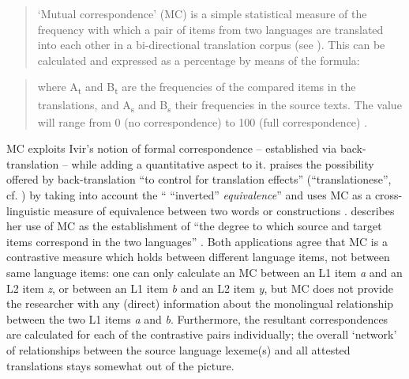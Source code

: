 \begin{quote}
‘Mutual correspondence’ (MC) is a simple statistical measure of the frequency with which a pair of items from two languages are translated into each other in a bi-directional translation corpus (see \citealt{hasselgard_adverbial_1999}). This can be calculated and expressed as a percentage by means of the formula:
\end{quote}

\begin{quote}\end{quote} 

\begin{quote}
where A\textsubscript{t} and B\textsubscript{t} are the frequencies of the compared items in the translations, and A\textsubscript{s} and B\textsubscript{s} their frequencies in the source texts. The value will range from 0 (no correspondence) to 100 (full correspondence) \citep[9]{altenberg_correspondence_2007}.
\end{quote}

MC exploits Ivir’s notion of formal correspondence – established via back-translation – while adding a quantitative aspect to it. \citet{de_los_angeles_gomez_gonzalez_causative_2008} praises the possibility offered by back-translation “to control for translation effects” (“translationese”, cf. \citealt{wollin_translationese_1986}) by taking into account the “ “inverted” \textit{equivalence}” \citep[186]{de_los_angeles_gomez_gonzalez_causative_2008} and uses MC as a cross-linguistic measure of equivalence between two words or constructions \citep{de_los_angeles_gomez_gonzalez_causative_2008}. \citet{mortier_semantic_2010} describes her use of MC as the establishment of “the degree to which source and target items correspond in the two languages” \citep[410]{mortier_semantic_2010}. Both applications agree that MC is a contrastive measure which holds between different language items, not between same language items: one can only calculate an MC between an L1 item \textit{a} and an L2 item \textit{z}, or between an L1 item \textit{b} and an L2 item \textit{y}, but MC does not provide the researcher with any (direct) information about the monolingual relationship between the two L1 items \textit{a} and \textit{b}. Furthermore, the resultant correspondences are calculated for each of the contrastive pairs individually; the overall ‘network’ of relationships between the source language lexeme(s) and all attested translations stays somewhat out of the picture.

